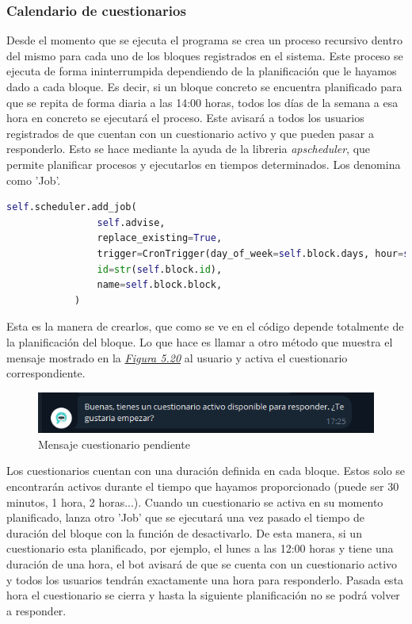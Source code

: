 \subsubsection{Calendario de cuestionarios}

Desde el momento que se ejecuta el programa se crea un proceso recursivo dentro del mismo para cada uno de los bloques registrados en el sistema. Este proceso se ejecuta de forma ininterrumpida dependiendo de la planificación que le hayamos dado a cada bloque. Es decir, si un bloque concreto se encuentra planificado para que se repita de forma diaria a las 14:00 horas, todos los días de la semana a esa hora en concreto se ejecutará el proceso. Este avisará a todos los usuarios registrados de que cuentan con un cuestionario activo y que pueden pasar a responderlo. Esto se hace mediante la ayuda de la libreria \textit{apscheduler}, que permite planificar procesos y ejecutarlos en tiempos determinados. Los denomina como 'Job'.

\begin{lstlisting}[language=Python]
    self.scheduler.add_job(
                self.advise,
                replace_existing=True,
                trigger=CronTrigger(day_of_week=self.block.days, hour=self.block.time.hour, minute=self.block.time.minute, second=self.block.time.second, timezone=pytz.timezone('Europe/Madrid')),
                id=str(self.block.id),
                name=self.block.block,
            )
\end{lstlisting}

Esta es la manera de crearlos, que como se ve en el código depende totalmente de la planificación del bloque. Lo que hace es llamar a otro método que muestra el mensaje mostrado en la \textit{\hyperref[fig:pending]{Figura 5.20}} al usuario y activa el cuestionario correspondiente. 

\begin{figure}[!ht]
    \centering
    \includegraphics[width=1\textwidth]{imagenes/active_quest.png}
    \caption{ Mensaje cuestionario pendiente }
    \label{fig:pending}
\end{figure}


Los cuestionarios cuentan con una duración definida en cada bloque. Estos solo se encontrarán activos durante el tiempo que hayamos proporcionado (puede ser 30 minutos, 1 hora, 2 horas...). Cuando un cuestionario se activa en su momento planificado, lanza otro 'Job' que se ejecutará una vez pasado el tiempo de duración del bloque con la función de desactivarlo. De esta manera, si un cuestionario esta planificado, por ejemplo, el lunes a las 12:00 horas y tiene una duración de una hora, el bot avisará de que se cuenta con un cuestionario activo y todos los usuarios tendrán exactamente una hora para responderlo. Pasada esta hora el cuestionario se cierra y hasta la siguiente planificación no se podrá volver a responder.

